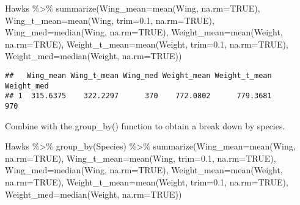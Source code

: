 \documentclass[
]{article}
\newenvironment{Shaded}{\begin{snugshade}}{\end{snugshade}}
\newcommand{\AttributeTok}[1]{\textcolor[rgb]{0.77,0.63,0.00}{#1}}
\newcommand{\ConstantTok}[1]{\textcolor[rgb]{0.00,0.00,0.00}{#1}}
\newcommand{\FloatTok}[1]{\textcolor[rgb]{0.00,0.00,0.81}{#1}}
\newcommand{\FunctionTok}[1]{\textcolor[rgb]{0.00,0.00,0.00}{#1}}
\newcommand{\NormalTok}[1]{#1}
\newcommand{\SpecialCharTok}[1]{\textcolor[rgb]{0.00,0.00,0.00}{#1}}
\begin{document}
\begin{Shaded}
\begin{Highlighting}[]
\NormalTok{Hawks }\SpecialCharTok{\%\textgreater{}\%} \FunctionTok{summarize}\NormalTok{(}\AttributeTok{Wing\_mean=}\FunctionTok{mean}\NormalTok{(Wing, }\AttributeTok{na.rm=}\ConstantTok{TRUE}\NormalTok{), }\AttributeTok{Wing\_t\_mean=}\FunctionTok{mean}\NormalTok{(Wing, }\AttributeTok{trim=}\FloatTok{0.1}\NormalTok{, }\AttributeTok{na.rm=}\ConstantTok{TRUE}\NormalTok{), }\AttributeTok{Wing\_med=}\FunctionTok{median}\NormalTok{(Wing, }\AttributeTok{na.rm=}\ConstantTok{TRUE}\NormalTok{), }\AttributeTok{Weight\_mean=}\FunctionTok{mean}\NormalTok{(Weight, }\AttributeTok{na.rm=}\ConstantTok{TRUE}\NormalTok{), }\AttributeTok{Weight\_t\_mean=}\FunctionTok{mean}\NormalTok{(Weight, }\AttributeTok{trim=}\FloatTok{0.1}\NormalTok{, }\AttributeTok{na.rm=}\ConstantTok{TRUE}\NormalTok{), }\AttributeTok{Weight\_med=}\FunctionTok{median}\NormalTok{(Weight, }\AttributeTok{na.rm=}\ConstantTok{TRUE}\NormalTok{))}
\end{Highlighting}
\end{Shaded}

\begin{verbatim}
##   Wing_mean Wing_t_mean Wing_med Weight_mean Weight_t_mean Weight_med
## 1  315.6375    322.2297      370    772.0802      779.3681        970
\end{verbatim}

Combine with the group\_by() function to obtain a break down by species.

\begin{Shaded}
\begin{Highlighting}[]
\NormalTok{Hawks }\SpecialCharTok{\%\textgreater{}\%} \FunctionTok{group\_by}\NormalTok{(Species) }\SpecialCharTok{\%\textgreater{}\%} \FunctionTok{summarize}\NormalTok{(}\AttributeTok{Wing\_mean=}\FunctionTok{mean}\NormalTok{(Wing, }\AttributeTok{na.rm=}\ConstantTok{TRUE}\NormalTok{), }\AttributeTok{Wing\_t\_mean=}\FunctionTok{mean}\NormalTok{(Wing, }\AttributeTok{trim=}\FloatTok{0.1}\NormalTok{, }\AttributeTok{na.rm=}\ConstantTok{TRUE}\NormalTok{), }\AttributeTok{Wing\_med=}\FunctionTok{median}\NormalTok{(Wing, }\AttributeTok{na.rm=}\ConstantTok{TRUE}\NormalTok{), }\AttributeTok{Weight\_mean=}\FunctionTok{mean}\NormalTok{(Weight, }\AttributeTok{na.rm=}\ConstantTok{TRUE}\NormalTok{), }\AttributeTok{Weight\_t\_mean=}\FunctionTok{mean}\NormalTok{(Weight, }\AttributeTok{trim=}\FloatTok{0.1}\NormalTok{, }\AttributeTok{na.rm=}\ConstantTok{TRUE}\NormalTok{), }\AttributeTok{Weight\_med=}\FunctionTok{median}\NormalTok{(Weight, }\AttributeTok{na.rm=}\ConstantTok{TRUE}\NormalTok{))}
\end{Highlighting}
\end{Shaded}
\end{document}
